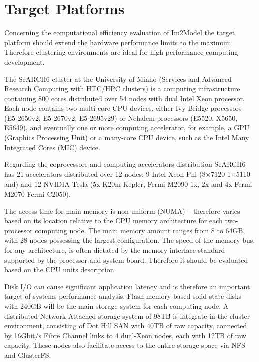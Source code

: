 \documentclass[
  oneside,
  11pt, a4paper,
  footinclude=true,
  headinclude=true,
  cleardoublepage=empty
]{scrbook}
\begin{document}
\section{Target Platforms}

Concerning the computational efficiency evaluation of Im2Model the target platform should extend the hardware performance limits to the maximum. Therefore clustering environments are ideal for high performance computing development.\par 
The SeARCH6 cluster at the University of Minho (Services and Advanced Research Computing with HTC/HPC clusters) is a computing infrastructure containing 800 cores distributed over 54 nodes with dual Intel Xeon processor. Each node contains two multi-core CPU devices, either Ivy Bridge processors (E5-2650v2, E5-2670v2, E5-2695v29) or Nehalem processors (E5520, X5650, E5649),
and eventually one or more computing accelerator, for example, a GPU (Graphics Processing Unit) or a many-core CPU device, such as the Intel Many Integrated Cores (MIC) device. 

Regarding the coprocessors and computing accelerators distribution SeARCH6 has 21 accelerators distributed over 12 nodes: 9 Intel Xeon Phi (8×7120 1×5110 and) and 12 NVIDIA Tesla (5x K20m Kepler, Fermi M2090 1x, 2x and 4x Fermi M2070 Fermi C2050).\par 

The access time for main memory is non-uniform (NUMA) -- therefore
varies based on its location relative to the CPU memory architecture for each two-processor computing node. The main memory amount ranges from 8 to 64GB, with 28 nodes possessing the largest configuration. 
The speed of the memory bus, for any architecture, is often dictated by the memory interface standard supported by the processor and system board. Therefore it should be evaluated based on the CPU units description.\par 

Disk I/O can cause significant application latency and is therefore an important target of systems performance analysis. 
Flash-memory-based solid-state disks with 240GB will be the main storage system for each computing node. A distributed Network-Attached storage system of 98TB is integrate in the cluster environment, consisting of Dot Hill SAN with 40TB of raw capacity, connected by 16Gbit/s Fibre Channel links to 4 dual-Xeon nodes, each with 12TB of raw capacity. These nodes also facilitate access to the entire storage space via NFS and GlusterFS.\par 
\end{document}
